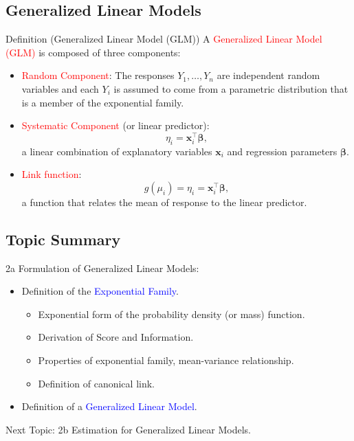 \documentclass[oneside]{book}\usepackage[]{graphicx}\usepackage[svgnames]{xcolor}
\providecommand{\Vector}[1]{\bm{#1}}%
\begin{document}
\subsection*{Generalized Linear Models}
\begin{Regular}{Definition (Generalized Linear Model (GLM))}
      A \textcolor{Red}{Generalized Linear Model (GLM)} is composed of three components:
      \begin{itemize}
            \item \textcolor{Red}{Random Component}: The responses $ Y_1,\ldots,Y_n $ are
                  independent random variables and each $ Y_i $ is assumed to come from a parametric distribution that is a member of the
                  exponential family.
            \item \textcolor{Red}{Systematic Component} (or linear predictor):
                  \[ \eta_i=\Vector{x}_i^\top\Vector{\beta}, \]
                  a linear combination of explanatory variables $ \Vector{x}_i $ and regression parameters $ \Vector{\beta} $.
            \item \textcolor{Red}{Link function}:
                  \[ g(\mu_i)=\eta_i=\Vector{x}_i^\top\Vector{\beta}, \]
                  a function that relates the mean of response to the linear predictor.
      \end{itemize}
\end{Regular}
\subsection*{Topic Summary}
2a Formulation of Generalized Linear Models:
\begin{itemize}
      \item Definition of the \textcolor{Blue}{Exponential Family}.
            \begin{itemize}
                  \item Exponential form of the probability density (or mass) function.
                  \item Derivation of Score and Information.
                  \item Properties of exponential family, mean-variance relationship.
                  \item Definition of canonical link.
            \end{itemize}
      \item Definition of a \textcolor{Blue}{Generalized Linear Model}.
\end{itemize}
Next Topic: 2b Estimation for Generalized Linear Models.
\end{document}
